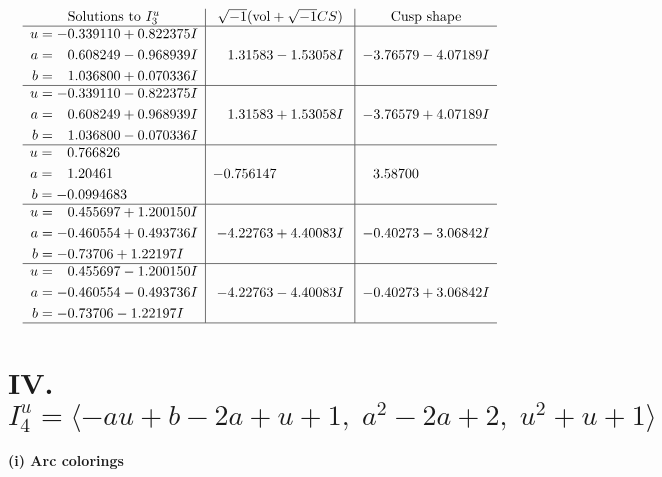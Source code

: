 \documentclass[1p]{elsarticle_modified}
\theoremstyle{definition}
\newcommand{\I}{\sqrt{-1}}
\begin{document}
$$\begin{array}{c|c|c}  
\text{Solutions to }I^u_{3}& \I (\text{vol} + \sqrt{-1}CS) & \text{Cusp shape}\\
 \hline 
\begin{aligned}
u &= -0.339110 + 0.822375 I \\
a &= \phantom{-}0.608249 - 0.968939 I \\
b &= \phantom{-}1.036800 + 0.070336 I\end{aligned}
 & \phantom{-}1.31583 - 1.53058 I & -3.76579 - 4.07189 I \\ \hline\begin{aligned}
u &= -0.339110 - 0.822375 I \\
a &= \phantom{-}0.608249 + 0.968939 I \\
b &= \phantom{-}1.036800 - 0.070336 I\end{aligned}
 & \phantom{-}1.31583 + 1.53058 I & -3.76579 + 4.07189 I \\ \hline\begin{aligned}
u &= \phantom{-}0.766826\phantom{ +0.000000I} \\
a &= \phantom{-}1.20461\phantom{ +0.000000I} \\
b &= -0.0994683\phantom{ +0.000000I}\end{aligned}
 & -0.756147\phantom{ +0.000000I} & \phantom{-}3.58700\phantom{ +0.000000I} \\ \hline\begin{aligned}
u &= \phantom{-}0.455697 + 1.200150 I \\
a &= -0.460554 + 0.493736 I \\
b &= -0.73706 + 1.22197 I\end{aligned}
 & -4.22763 + 4.40083 I & -0.40273 - 3.06842 I \\ \hline\begin{aligned}
u &= \phantom{-}0.455697 - 1.200150 I \\
a &= -0.460554 - 0.493736 I \\
b &= -0.73706 - 1.22197 I\end{aligned}
 & -4.22763 - 4.40083 I & -0.40273 + 3.06842 I\\
 \hline 
 \end{array}$$\newpage\newpage\renewcommand{\arraystretch}{1}
\centering \section*{IV. $I^u_{4}= \langle - a u+b-2 a+u+1,\;a^2-2 a+2,\;u^2+u+1 \rangle$}
\flushleft \textbf{(i) Arc colorings}\\
\end{document}

